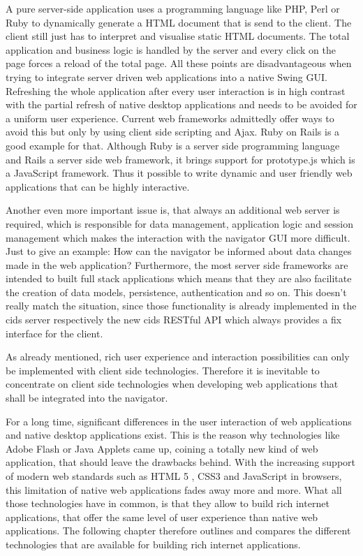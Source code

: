 A pure server-side application uses a programming language like PHP, Perl or Ruby to dynamically generate a HTML document that is send to the client.
The client still just has to interpret and visualise static HTML documents.
The total application and business logic is handled by the server and every click on the page forces a reload of the total page.
All these points are disadvantageous when trying to integrate server driven web applications into a native Swing GUI.
Refreshing the whole application after every user interaction is in high contrast with the partial refresh of native desktop applications and needs to be avoided for a uniform user experience.
Current web frameworks admittedly offer ways to avoid this but only by using client side scripting and Ajax.
Ruby on Rails is a good example for that.
Although Ruby is a server side programming language and Rails a server side web framework, it brings support for prototype.js which is a JavaScript framework. Thus it possible to write dynamic and user friendly web applications that can be highly interactive.

Another even more important issue is, that always an additional web server is required, which is responsible for data management, application logic and session management which makes the interaction with the navigator GUI more difficult.
Just to give an example: How can the navigator be informed about data changes made in the web application? Furthermore, the most server side frameworks are intended to built full stack applications which means that they are also facilitate the creation of data models, persistence, authentication and so on.
This doesn't really match the situation, since those functionality is already implemented in the cids server respectively the new cids RESTful API which always provides a fix interface for the client.

As already mentioned, rich user experience and interaction possibilities can only be implemented with client side technologies. Therefore it is inevitable to concentrate on client side technologies when developing web applications that shall be integrated into the navigator.

For a long time, significant differences in the user interaction of web applications and native desktop applications exist. 
This is the reason why technologies like Adobe Flash or Java Applets came up, coining a totally new kind of web application, that should leave the drawbacks behind. With the increasing support of modern web standards such as HTML 5 , CSS3 and JavaScript in browsers, this limitation of native web applications fades away more and more. What all those technologies have in common, is that they allow to build rich internet applications, that offer the same level of user experience than native web applications. The following chapter therefore outlines and compares the different technologies that are available for building rich internet applications.


